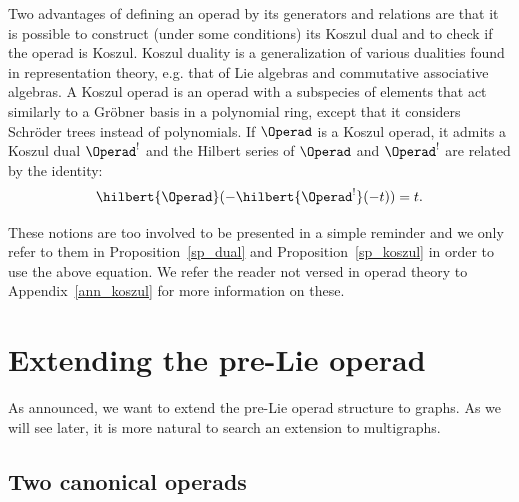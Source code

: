 Two advantages of defining an operad by its generators and relations are that it is possible to construct 
(under some conditions) its Koszul dual and to check if the operad is Koszul. 
Koszul duality is a generalization of various dualities found in representation theory, e.g. that
of Lie algebras and commutative associative algebras. A Koszul operad is an operad with a 
subspecies of elements that act similarly to a Gröbner basis in a polynomial ring, except that it considers
Schröder trees instead of polynomials.
If $\Operad$ is a Koszul operad, it admits a Koszul dual $\Operad^!$ and the Hilbert series of $\Operad$ and $\Operad^!$ 
are related by the identity:
\begin{equation}
    \hilbert{\Operad}(-\hilbert{\Operad^!}(-t)) = t.
\end{equation}

These notions are too involved to be presented in a simple reminder and we only refer to them in 
Proposition~\ref{sp_dual} and Proposition~\ref{sp_koszul} in order to use the above equation. We refer the reader 
not versed in operad theory to Appendix~\ref{ann_koszul} for more information on these. 








\section{Extending the pre-Lie operad}\label{sec_extending_plie}
As announced, we want to extend the pre-Lie operad structure to graphs. As we will see later, it is more
natural to search an extension to multigraphs.




\subsection{Two canonical operads}\label{subsec_cano_op}

